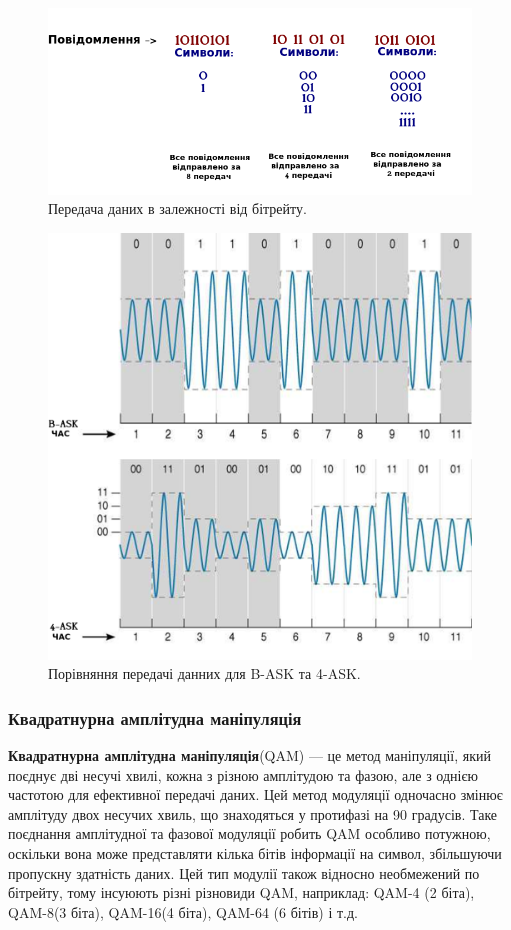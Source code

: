 \documentclass{article}
\begin{document}
\begin{figure}[h!]
	\centering
	\includegraphics[width=0.8\linewidth]{images/transmittion_speed.png}
	\caption{\label{fig:transmittion_speed} Передача даних в залежності від бітрейту.}
\end{figure}

\begin{figure}[h!]
	\centering
	\includegraphics[width=0.7\linewidth]{images/comparison-bask-vs-4ask.png}
	\caption{\label{fig:comparison-bask-vs-4ask} Порівняння передачі данних для B-ASK та 4-ASK.}
\end{figure}


\newpage
\subsubsection{Квадратнурна амплітудна маніпуляція}
\textbf{Квадратнурна амплітудна маніпуляція}(QAM) --- це метод маніпуляції, який поєднує дві несучі хвилі, кожна з різною амплітудою та фазою, але з однією частотою для ефективної передачі даних. Цей метод модуляції одночасно змінює амплітуду двох несучих хвиль, що знаходяться у протифазі на 90 градусів. Таке поєднання амплітудної та фазової модуляції робить QAM особливо потужною, оскільки вона може представляти кілька бітів інформації на символ, збільшуючи пропускну здатність даних. Цей тип модулії також відносно необмежений по бітрейту, тому інсуюють різні різновиди QAM, наприклад: QAM-4 (2 біта), QAM-8(3 біта), QAM-16(4 біта), QAM-64 (6 бітів) і т.д.
\end{document}

